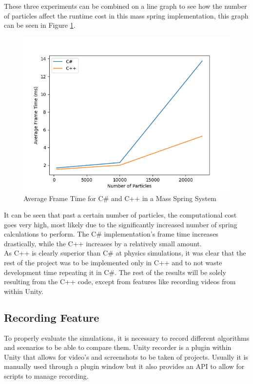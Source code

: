 \documentclass[12pt,a4paper]{article}
\begin{document}
These three experiments can be combined on a line graph to see how the number of particles affect the runtime cost in this mass spring implementation, this graph can be seen in Figure \ref{line}.
\begin{figure}
	\centering
	\includegraphics[scale=0.7]{line.png}
	\caption{Average Frame Time for C\# and C++ in a Mass Spring System}
	\label{line}
\end{figure}

It can be seen that past a certain number of particles, the computational cost goes very high, most likely due to the significantly increased number of spring calculations to perform. The C\# implementation's frame time increases drastically, while the C++ increases by a relatively small amount.\\

As C++ is clearly superior than C\# at physics simulations, it was clear that the rest of the project was to be implemented only in C++ and to not waste development time repeating it in C\#. The rest of the results will be solely resulting from the C++ code, except from features like recording videos from within Unity.
\subsection{Recording Feature}
To properly evaluate the simulations, it is necessary to record different algorithms and scenarios to be able to compare them. Unity recorder is a plugin within Unity that allows for video's and screenshots to be taken of projects. Usually it is manually used through a plugin window but it also provides an API to allow for scripts to manage recording. \\
\end{document}

